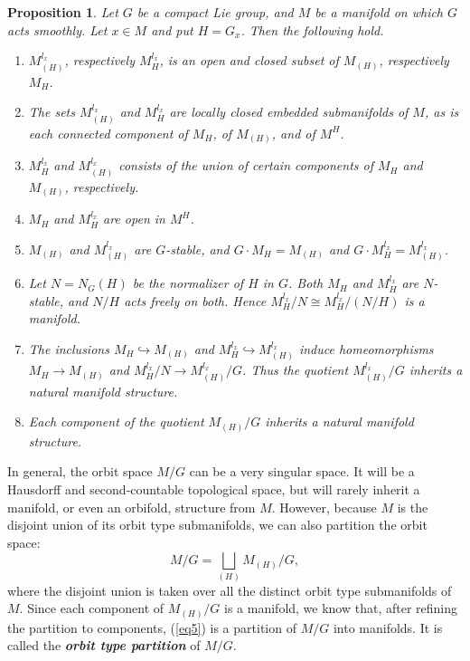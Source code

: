 \documentclass[pdftex]{sigma}
\newtheorem{Proposition}[Theorem]{Proposition}
\numberwithin{equation}{section}
\newcommand{\deff}[1]{\textbf{\emph{#1}}}
\newcommand{\litlet}{\renewcommand{\labelenumi}{(\alph{enumi})}}
\begin{document}
\begin{Proposition} \label{prop2}
Let $G$ be a compact Lie group, and $M$ be a manifold on which $G$ acts smoothly.  Let $x \in M$ and put $H = G_x$.  Then the following hold.
\begin{enumerate} \itemsep=0pt\litlet

  \item $M_{(H)}^{l_x}$, respectively $M_{H}^{l_x}$, is an open and closed subset of $M_{(H)}$, respectively $M_H$.

  \item The sets $M_{(H)}^{l_x}$ and $M_H^{l_x}$ are locally closed embedded submanifolds of $M$, as is each connected component of $M_H$, of $M_{(H)}$, and of $M^H$.

  \item $M_H^{l_x}$ and $M_{(H)}^{l_x}$ consists of the union of certain components of $M_H$ and $M_{(H)}$, respectively.

  \item $M_H$ and $M_H^{l_x}$ are open in $M^H$.

  \item $M_{(H)}$ and $M_{(H)}^{l_x}$ are $G$-stable, and $G \cdot M_H = M_{(H)}$ and $G \cdot M_H^{l_x} = M_{(H)}^{l_x}$.

  \item Let $N=N_G(H)$ be the normalizer of $H$ in $G$. Both $M_H$ and $M_H^{l_x}$ are $N$-stable, and $N/H$ acts freely on both.  Hence $M_H^{l_x} / N \cong M_H^{l_x} / \left( N/H \right)$ is a manifold.

  \item The inclusions $M_H \hookrightarrow M_{(H)}$ and $M_H^{l_x} \hookrightarrow M_{(H)}^{l_x}$ induce homeomorphisms $M_H \to M_{(H)}$ and $M_H^{l_x} / N \to M_{(H)}^{l_x} / G$.  Thus the quotient $M_{(H)}^{l_x} / G$ inherits a natural manifold structure.

  \item Each component of the quotient $M_{(H)} / G$ inherits a natural manifold structure.
\end{enumerate}
\end{Proposition}


In general, the orbit space $M/G$ can be a very singular space.  It will be a Hausdorf\/f and second-countable topological space, but will rarely inherit a manifold, or even an orbifold, structure from $M$.
However, because $M$ is the disjoint union of its orbit type submanifolds, we can also partition the orbit space:
\begin{equation}
 \label{eq5}
   M/G = \bigsqcup_{(H)} M_{(H)}/G,
\end{equation}
where the disjoint union is taken over all the distinct orbit type submanifolds of $M$.
Since each component of $M_{(H)}/G$ is a manifold, we know that, after ref\/ining the partition to components, (\ref{eq5}) is a partition of $M/G$ into manifolds.  It is called the \deff{orbit type partition} of $M/G$.
\end{document}
